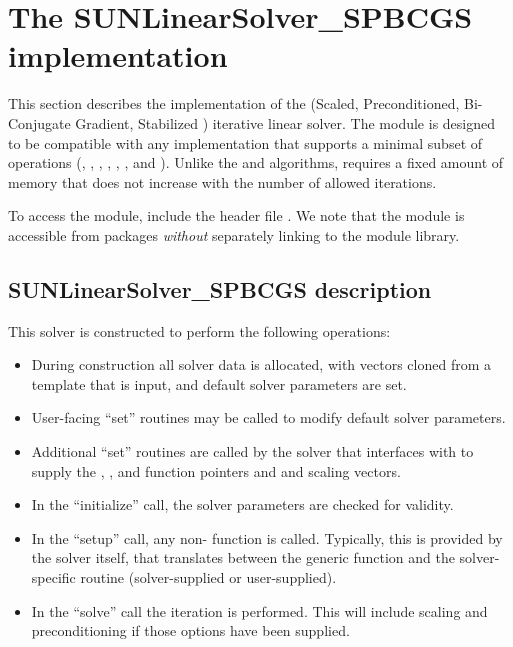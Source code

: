 \section{The SUNLinearSolver\_SPBCGS implementation}
\label{ss:sunlinsol_spbcgs}

This section describes the {\sunlinsol} implementation of the {\spbcgs}
(Scaled, Preconditioned, Bi-Conjugate Gradient, Stabilized \cite{Van:92})
iterative linear solver. The {\sunlinsolspbcgs} module is designed to be
compatible with any {\nvector} implementation that supports a minimal subset
of operations (, , ,
, , , and
). Unlike the {\spgmr} and {\spfgmr} algorithms, {\spbcgs}
requires a fixed amount of memory that does not increase with the number of
allowed iterations.

To access the {\sunlinsolspbcgs} module, include the header file
. We note that the {\sunlinsolspbcgs} module is
accessible from {\sundials} packages \textit{without} separately linking to
the  module library.


\subsection{SUNLinearSolver\_SPBCGS description}
\label{ss:sunlinsol_spbcgs_description}

This solver is constructed to perform the following operations:
\begin{itemize}
\item During construction all {\nvector} solver data is allocated,
  with vectors cloned from a template {\nvector} that is input, and
  default solver parameters are set.
\item User-facing ``set'' routines may be called to modify default
  solver parameters.
\item Additional ``set'' routines are called by the {\sundials} solver
  that interfaces with {\sunlinsolspbcgs} to supply the
  , , and  function pointers and
   and  scaling vectors.
\item In the ``initialize'' call, the solver parameters are checked
  for validity.
\item In the ``setup'' call, any non-
   function is called.  Typically, this is provided by
  the {\sundials} solver itself, that translates between the
  generic  function and the
  solver-specific routine (solver-supplied or user-supplied).
\item In the ``solve'' call the {\spbcgs} iteration is performed.  This
  will include scaling and preconditioning if those options have been
  supplied.
\end{itemize}


